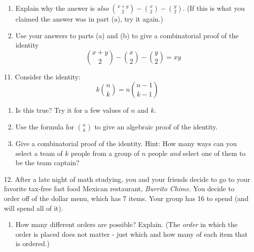 \documentclass[10pt,]{book}
\theoremstyle{plain}
\theoremstyle{definition}
\theoremstyle{definition}
\theoremstyle{definition}
\numberwithin{equation}{chapter}
\begin{document}
\begin{exerciselist}
\begin{enumerate}[label=(\alph*)]
\item\hypertarget{li-797}{}
                Explain why the answer is \emph{also} \({x+y \choose 2} - {x \choose 2} - {y \choose 2}\). (If this is what you claimed the answer was in part (a), try it again.)


\item\hypertarget{li-798}{}
                Use your answers to parts (a) and (b) to give a combinatorial proof of the identity
                \begin{equation*}
                  {x+y \choose 2} - {x \choose 2} - {y \choose 2} = xy
                \end{equation*}

\end{enumerate}
\par\smallskip
\item[11.]\hypertarget{exercise-134}{}
            Consider the identity:
            \begin{equation*}
              k{n\choose k} = n{n-1 \choose k-1}
            \end{equation*}
\leavevmode%
\begin{enumerate}[label=(\alph*)]
\item\hypertarget{li-799}{}
                Is this true? Try it for a few values of \(n\) and \(k\).


\item\hypertarget{li-800}{}
                Use the formula for \({n \choose k}\) to give an algebraic proof of the identity.


\item\hypertarget{li-801}{}
                Give a combinatorial proof of the identity. Hint: How many ways can you select a team of \(k\) people from a group of \(n\) people \emph{and} select one of them to be the team captain?


\end{enumerate}
\par\smallskip
\item[12.]\hypertarget{exercise-135}{}
            After a late night of math studying, you and your friends decide to go to your favorite tax-free fast food Mexican restaurant, \emph{Burrito Chime}. You decide to order off of the dollar menu, which has 7 items. Your group has
            \textdollar{}16 to spend (and will spend all of it).
\leavevmode%
\begin{enumerate}[label=(\alph*)]
\item\hypertarget{li-802}{}
                How many different orders are possible? Explain. (The \emph{order} in which the order is placed does not matter - just which and how many of each item that is ordered.)



\end{enumerate}
\end{exerciselist}
\end{document}
